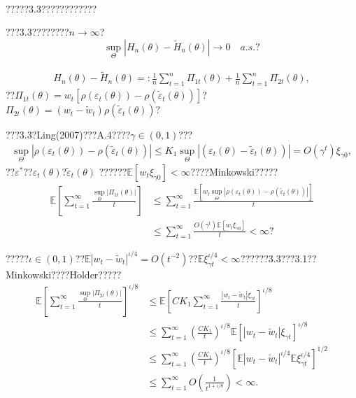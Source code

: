 \documentclass[a4paper,12pt,openany,oneside,utf-8]{ctexbook}
\newcommand{\xiaosihao}{\fontsize{12pt}{\baselineskip}\selectfont}
\begin{document}
	\
	
	?????3.3????????????
	
	\noindent{\xiaosihao\heiti ??~3.6} ???3.3????????$n\rightarrow \infty$?
	$$
	\sup _{\Theta}\left|H_{n}(\theta)-\tilde{H}_{n}(\theta)\right| \rightarrow 0 \quad a.s.\mbox{?}
	$$
	
	\noindent{\xiaosihao\heiti ??~3.6??}
	\begin{align}
		H_{n}(\theta)-\tilde{H}_{n}(\theta)=: \frac{1}{n} \sum_{t=1}^{n} \Pi_{1 t}(\theta)+\frac{1}{n} \sum_{t=1}^{n} \Pi_{2 t}(\theta),\nonumber
	\end{align}
	??$\Pi_{1 t}(\theta)=w_t\left[\rho(\varepsilon_t(\theta))-\rho(\tilde{\varepsilon}_t(\theta))\right]$?$\Pi_{2 t}(\theta)=(w_t-\tilde{ w}_t)\rho(\tilde{\varepsilon}_t(\theta))\mbox{?}$
	
	???3.3?Ling(2007)???A.4????$\gamma\in(0,1)$???
	\begin{align}
		\sup _{\Theta}\left|\rho(\varepsilon_{t}(\theta))-\rho(\tilde{\varepsilon}_{t}(\theta))\right|\le K_1\sup_{\Theta}\left|\left(\varepsilon_{t}(\theta)-\tilde{\varepsilon}_{t}(\theta)\right)\right|= O(\gamma^t)\xi_{\gamma 0},\nonumber
	\end{align}
	??$\varepsilon^{*}$??$\varepsilon_{t}(\theta)$?$\tilde{\varepsilon}_{t}(\theta)$ ??????$\mathbb{E}\left[w_{t} \xi_{\gamma 0}\right]<\infty$????Minkowski?????
	\begin{align}\label{332}
		\mathbb{E}\left[\sum_{t=1}^{\infty} \frac{\sup _{\Theta}\left|\Pi_{1 t}(\theta)\right|}{t}\right] &\leq \sum_{t=1}^{\infty} \frac{\mathbb{E}\left[w_t \sup _{\Theta}\left|\rho(\varepsilon_{t}(\theta))-\rho(\tilde{\varepsilon}_{t}(\theta))\right|\right]}{t}\nonumber\\
		&\le\sum_{t=1}^{\infty}\frac{O(\gamma^t)\mathbb{E}\left[w_{t} \xi_{\gamma 0}\right]}{t}<\infty\mbox{?}
	\end{align}
	
	\noindent ?????$\iota\in(0,1)$??$\mathbb{E}|w_t-\widetilde{w}_t|^{\iota/4}=O(t^{-2})$??$\mathbb{E} \xi_{\gamma t}^{\iota / 4}<\infty$??????3.3???3.1??Minkowski????H$\ddot{\mathrm{o}}$lder?????
	\begin{align}\label{333}
		\mathbb{E}\left[\sum_{t=1}^{\infty} \frac{\sup _{\Theta}\left|\Pi_{2 t}(\theta)\right|}{t}\right]^{\iota/ 8}
		&\le \mathbb{E}\left[CK_1\sum_{t=1}^{\infty} \frac{\left|w_t-\tilde{w}_t\right|\xi_{\gamma t}}{t}\right]^{\iota/8}\nonumber\\
		&\le \sum_{t=1}^{\infty}\left(\frac{CK_1}{t}\right)^{\iota/8}\mathbb{E}\left[\left|w_t-\tilde{w}_t\right|\xi_{\gamma t}\right]^{\iota/8}\nonumber\\
		&\le \sum_{t=1}^{\infty}\left(\frac{CK_1}{t}\right)^{\iota/8}\left[\mathbb{E}\left|w_t-\tilde{w}_t\right|^{\iota/4}\mathbb{E}\xi_{\gamma t}^{\iota /4}\right]^{1/2}\nonumber\\
		&\le\sum_{t=1}^{\infty} O\left(\frac{1}{t^{1+\iota / 8}}\right)<\infty.
	\end{align}
	
\end{document}
